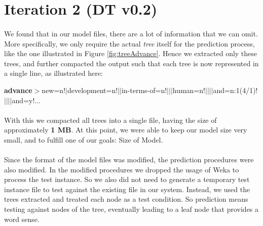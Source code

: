 

\section{Iteration 2 (DT v0.2)}
\label{it:2}
\paragraph{}
We found that in our model files, there are a lot of information that we can omit. More specifically, we only require the actual \textit{tree} itself for the prediction process, like the one illustrated in Figure \ref{fig:treeAdvance}. Hence we extracted only these trees, and further compacted the output such that each tree is now represented in a single line, as illustrated here:
\begin{center}
\textbf{advance$>$}new=n!$|$development=n!$||$in-terms-of=n!$|||$human=n!$||||$and=n:1(4/1)!$||||$and=y!$\ldots$
\end{center}

\paragraph{}
With this we compacted all trees into a single file, having the size of approximately \textbf{1 MB}. At this point, we were able to keep our model size very small, and to fulfill one of our goals: Size of Model.

\paragraph{}
Since the format of the model files was modified, the prediction procedures were also modified. In the modified procedures we dropped the usage of Weka to process the test instance. So we also did not need to generate a temporary test instance file to test against the existing file in our system. Instead, we used the trees extracted and treated each node as a test condition. So prediction means testing against nodes of the tree, eventually leading to a leaf node that provides a word sense.


